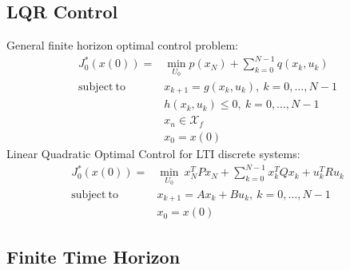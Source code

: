 \documentclass[a4paper,landscape,8pt,fleqn]{scrartcl}
\newcommand{\mc}[1]{\mathcal{#1}}
\begin{document}
\begin{multicols}{3}
\section{LQR Control}
General finite horizon optimal control problem:
\begin{align*}
J_0^*(x(0)) =& \min_{U_0} p(x_N)+\sum_{k=0}^{N-1} q(x_k,u_k) \\
\mathrm{subject~to}\quad& x_{k+1} = g(x_k,u_k), ~k=0,\dots,N-1 \\
&h(x_k,u_k) \leq 0, ~k=0,\dots,N-1 \\
&x_n \in \mc{X}_f \\
&x_0 = x(0)
\end{align*}
Linear Quadratic Optimal Control for LTI discrete systems:
\begin{align*}
	J_0^*(x(0)) =& \min_{U_0} ~x_N^T P x_N + \sum_{k=0}^{N-1} x_k^T Q x_k + u_k^T R u_k \\
	\mathrm{subject~to}\quad& x_{k+1} = A x_k + B u_k , ~k=0,\dots,N-1 \\
	& x_0 = x(0)
\end{align*}
\subsection{Finite Time Horizon}

\end{multicols}
\end{document}
